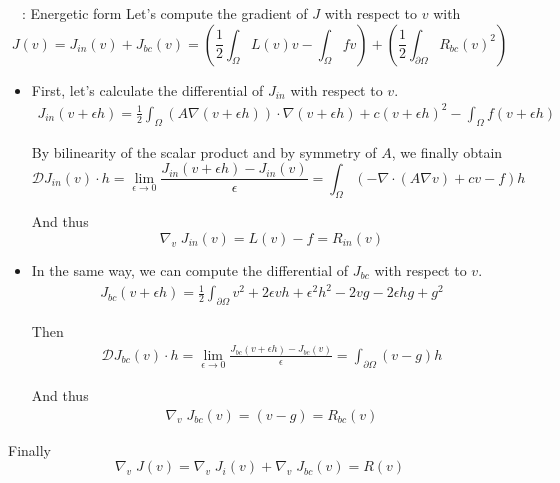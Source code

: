 \begin{frame}[allowframebreaks]{\appendixname~\theappendixframenumber~: Energetic form} 
	Let's compute the gradient of $J$ with respect to $v$ with
	\begin{equation*}
		J(v)=J_{in}(v)+J_{bc}(v)=\left(\frac{1}{2}\int_\Omega L(v)v - \int_\Omega fv\right) + \left(\frac{1}{2}\int_{\partial\Omega} R_{bc}(v)^2\right)
	\end{equation*}

	\begin{itemize}[\textbullet]
		\item First, let's calculate the differential of $J_{in}$ with respect to $v$.
		\begin{align*}
			J_{in}(v+\epsilon h)=\frac{1}{2} \int_{\Omega} (A\nabla(v+\epsilon h)) \cdot \nabla(v+\epsilon h) + c(v+\epsilon h)^2 - \int_{\Omega} f(v+\epsilon h)
		\end{align*}
		
		By bilinearity of the scalar product and by symmetry of $A$, we finally obtain
		\begin{equation*}
			\mathcal{D}J_{in}(v)\cdot h = \lim_{\epsilon\rightarrow 0}\frac{J_{in}(v+\epsilon h)-J_{in}(v)}{\epsilon} = \int_{\Omega} (-\nabla\cdot(A\nabla v) + cv - f)h
		\end{equation*}
		
		And thus
		\begin{equation*}
			\nabla_v \; J_{in}(v) = L(v) - f = R_{in}(v)
		\end{equation*}
	
		\newpage
		
		\item In the same way, we can compute the differential of $J_{bc}$ with respect to $v$.
		\begin{align*}
			J_{bc}(v+\epsilon h)=\frac{1}{2} \int_{\partial\Omega} v^2+2\epsilon vh +\epsilon^2 h^2 - 2vg - 2\epsilon hg+g^2
		\end{align*}
		
		Then
		\begin{align*}
			\mathcal{D}J_{bc}(v)\cdot h =  \lim_{\epsilon\rightarrow 0}\frac{J_{bc}(v+\epsilon h)-J_{bc}(v)}{\epsilon} = \int_{\partial\Omega} (v-g)h
		\end{align*}
		
		And thus
		\begin{align*}
			\nabla_v \; J_{bc}(v) = (v-g) = R_{bc}(v) 
		\end{align*}
	\end{itemize}
	
	Finally
	\begin{equation*}
		\nabla_v \; J(v) = \nabla_v \; J_{i}(v) + \nabla_v \; J_{bc}(v) = R(v)
	\end{equation*}
\end{frame}
\addtocounter{appendixframenumber}{1}

